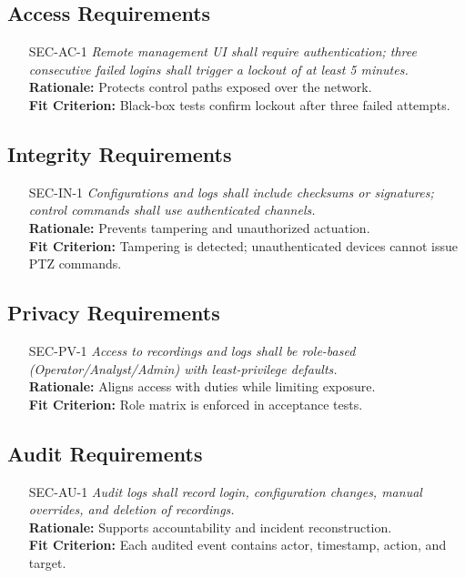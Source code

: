 \documentclass[12pt]{article}
\begin{document}
\subsection{Access Requirements}
\begin{itemize}[leftmargin=*]
  \item[SEC-AC-1] \emph{Remote management UI shall require authentication; three consecutive failed logins shall trigger a lockout of at least 5 minutes.}\\
  \textbf{Rationale:} Protects control paths exposed over the network.\\
  \textbf{Fit Criterion:} Black-box tests confirm lockout after three failed attempts.
\end{itemize}

\subsection{Integrity Requirements}
\begin{itemize}[leftmargin=*]
  \item[SEC-IN-1] \emph{Configurations and logs shall include checksums or signatures; control commands shall use authenticated channels.}\\
  \textbf{Rationale:} Prevents tampering and unauthorized actuation.\\
  \textbf{Fit Criterion:} Tampering is detected; unauthenticated devices cannot issue PTZ commands.
\end{itemize}

\subsection{Privacy Requirements}
\begin{itemize}[leftmargin=*]
  \item[SEC-PV-1] \emph{Access to recordings and logs shall be role-based (Operator/Analyst/Admin) with least-privilege defaults.}\\
  \textbf{Rationale:} Aligns access with duties while limiting exposure.\\
  \textbf{Fit Criterion:} Role matrix is enforced in acceptance tests.
\end{itemize}

\subsection{Audit Requirements}
\begin{itemize}[leftmargin=*]
  \item[SEC-AU-1] \emph{Audit logs shall record login, configuration changes, manual overrides, and deletion of recordings.}\\
  \textbf{Rationale:} Supports accountability and incident reconstruction.\\
  \textbf{Fit Criterion:} Each audited event contains actor, timestamp, action, and target.
\end{itemize}
\end{document}
